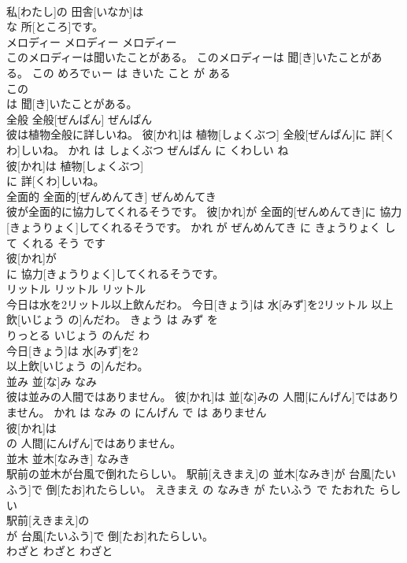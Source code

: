\documentclass[8pt]{extreport}
\begin{document}
\begin{CJK}{UTF8}{min}
\\	私[わたし]の 田舎[いなか]は
\\	な 所[ところ]です。			
\\	メロディー	メロディー	メロディー	
\\	このメロディーは聞いたことがある。	このメロディーは 聞[き]いたことがある。	この めろでぃー は きいた こと が ある	
\\	この
\\	は 聞[き]いたことがある。			
\\	全般	全般[ぜんぱん]	ぜんぱん	
\\	彼は植物全般に詳しいね。	彼[かれ]は 植物[しょくぶつ] 全般[ぜんぱん]に 詳[くわ]しいね。	かれ は しょくぶつ ぜんぱん に くわしい ね	
\\	彼[かれ]は 植物[しょくぶつ]
\\	に 詳[くわ]しいね。			
\\	全面的	全面的[ぜんめんてき]	ぜんめんてき	
\\	彼が全面的に協力してくれるそうです。	彼[かれ]が 全面的[ぜんめんてき]に 協力[きょうりょく]してくれるそうです。	かれ が ぜんめんてき に きょうりょく して くれる そう です	
\\	彼[かれ]が
\\	に 協力[きょうりょく]してくれるそうです。			
\\	リットル	リットル	リットル	
\\	今日は水を2リットル以上飲んだわ。	今日[きょう]は 水[みず]を2リットル 以上飲[いじょう の]んだわ。	きょう は みず を 
\\	りっとる いじょう のんだ わ	
\\	今日[きょう]は 水[みず]を2
\\	以上飲[いじょう の]んだわ。			
\\	並み	並[な]み	なみ	
\\	彼は並みの人間ではありません。	彼[かれ]は 並[な]みの 人間[にんげん]ではありません。	かれ は なみ の にんげん で は ありません	
\\	彼[かれ]は
\\	の 人間[にんげん]ではありません。			
\\	並木	並木[なみき]	なみき	
\\	駅前の並木が台風で倒れたらしい。	駅前[えきまえ]の 並木[なみき]が 台風[たいふう]で 倒[たお]れたらしい。	えきまえ の なみき が たいふう で たおれた らしい	
\\	駅前[えきまえ]の
\\	が 台風[たいふう]で 倒[たお]れたらしい。			
\\	わざと	わざと	わざと	

\end{CJK}
\end{document}

